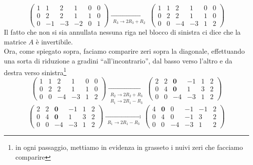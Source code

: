 \documentclass{book}
\begin{document}
\begin{equation*}
  \left(
  \begin{array}{ccc|ccc}
     1 & 1 & 2 &1 &0&0\\
    0 & 2 &2 & 1&1&0\\
     0 & -1 &-3&-2&0&1
  \end{array}\right)
  \underset{
  \begin{matrix}
    R_3\to 2R_3+R_2
  \end{matrix}}{\rightarrow} 
  \left(
  \begin{array}{ccc|ccc}
     1 & 1 & 2 &1 &0&0\\
    0 & 2 &2 & 1&1&0\\
     0 & 0 &-4&-3&1&2
  \end{array}\right)
\end{equation*}
Il fatto che non si sia annullata nessuna riga nel blocco di sinistra ci dice che la matrice $A$ è invertibile.\\
Ora, come spiegato sopra, faciamo comparire zeri sopra la diagonale, effettuando una sorta di riduzione a gradini
``all'incontrario'', dal basso verso l'altro e da destra verso sinistra\footnote{in ogni passaggio, mettiamo in
  evidenza in grasseto i nuivi zeri che facciamo comparire}
\begin{equation*}
   \left(
  \begin{array}{ccc|ccc}
     1 & 1 & 2 &1 &0&0\\
     0 & 2 &2 & 1&1&0\\
     0 & 0 &-4&-3&1&2
  \end{array}\right)
   \underset{
  \begin{matrix}
    R_2\to 2R_2+R_3\\ R_1\to  2R_1-R_3
  \end{matrix}}{\to}
   \left(
  \begin{array}{ccc|ccc}
     2 & 2 & \mathbf{0} &-1 &1&2\\
     0 & 4 &\mathbf{0} & 1&3&2\\
     0 & 0 &-4&-3&1&2
  \end{array}\right)
\end{equation*}
\begin{equation*}
    \left(
  \begin{array}{ccc|ccc}
     2 & 2 & \mathbf{0} &-1 &1&2\\
     0 & 4 &\mathbf{0} & 1&3&2\\
     0 & 0 &-4&-3&1&2
  \end{array}\right)
   \underset{
  \begin{matrix}
    R_1\to  2R_1-R_3
  \end{matrix}}{\to}
    \left(
  \begin{array}{ccc|ccc}
     4 & \mathbf{0} & 0 &-1 &-1&2\\
     0 & 4 &0 & -1&3&2\\
     0 & 0 &-4&-3&1&2
  \end{array}\right)
\end{equation*}
\end{document}
